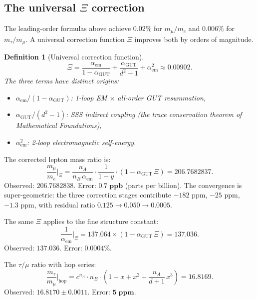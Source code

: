 \documentclass[12pt]{article}
\newtheorem{definition}[theorem]{Definition}
\theoremstyle{remark}
\theoremstyle{definition}
\newcommand{\agut}{\alpha_{\mathrm{GUT}}}
\begin{document}
\subsection{The universal $\Xi$ correction}
\label{sec:xi_correction}

The leading-order formulas above achieve $0.02\%$ for $m_\mu/m_e$ and $0.006\%$ for $m_\tau/m_\mu$.  A universal correction function $\Xi$ improves both by orders of magnitude.

\begin{definition}[Universal correction function]
\begin{equation}
\Xi = \frac{\alpha_\mathrm{em}}{1 - \alpha_\mathrm{GUT}} + \frac{\alpha_\mathrm{GUT}}{d^2 - 1} + \alpha_\mathrm{em}^2 \approx 0.00902.
\end{equation}
The three terms have distinct origins:
\begin{itemize}
\item $\alpha_\mathrm{em}/(1 - \agut)$: 1-loop EM $\times$ all-order GUT resummation,
\item $\agut/(d^2 - 1)$: SSS indirect coupling (the trace conservation theorem of \textit{Mathematical Foundations}),
\item $\alpha_\mathrm{em}^2$: 2-loop electromagnetic self-energy.
\end{itemize}
\end{definition}

The corrected lepton mass ratio is:
\begin{equation}
\boxed{\frac{m_\mu}{m_e}\bigg|_{\Xi} = \frac{n_A}{n_B\,\alpha_\mathrm{em}} \cdot \frac{1}{1 - y} \cdot (1 - \agut\,\Xi) = 206.7682837.}
\end{equation}
Observed: $206.7682838$.  Error: $\mathbf{0.7\;\text{ppb}}$ (parts per billion).  The convergence is super-geometric: the three correction stages contribute $-182$ ppm, $-25$ ppm, $-1.3$ ppm, with residual ratio $0.125 \to 0.050 \to 0.0005$.

The same $\Xi$ applies to the fine structure constant:
\begin{equation}
\frac{1}{\alpha_\mathrm{em}}\bigg|_{\Xi} = 137.064 \times (1 - \agut\,\Xi) = 137.036.
\end{equation}
Observed: $137.036$.  Error: $\mathbf{0.0004\%}$.

The $\tau/\mu$ ratio with hop series:
\begin{equation}
\frac{m_\tau}{m_\mu}\bigg|_{\text{hop}} = c^{n_A}\cdot n_B \cdot \left(1 + x + x^2 + \frac{n_A}{d+1}\,x^3\right) = 16.8169.
\end{equation}
Observed: $16.8170 \pm 0.0011$.  Error: $\mathbf{5\;\text{ppm}}$.
\end{document}
